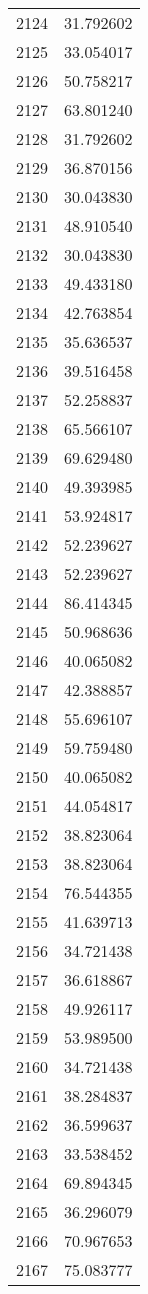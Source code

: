 \documentclass[12pt]{article}
\begin{document}
\begin{longtable}{@{}cc@{}}
2124 & 31.792602 \\
2125 & 33.054017 \\
2126 & 50.758217 \\
2127 & 63.801240 \\
2128 & 31.792602 \\
2129 & 36.870156 \\
2130 & 30.043830 \\
2131 & 48.910540 \\
2132 & 30.043830 \\
2133 & 49.433180 \\
2134 & 42.763854 \\
2135 & 35.636537 \\
2136 & 39.516458 \\
2137 & 52.258837 \\
2138 & 65.566107 \\
2139 & 69.629480 \\
2140 & 49.393985 \\
2141 & 53.924817 \\
2142 & 52.239627 \\
2143 & 52.239627 \\
2144 & 86.414345 \\
2145 & 50.968636 \\
2146 & 40.065082 \\
2147 & 42.388857 \\
2148 & 55.696107 \\
2149 & 59.759480 \\
2150 & 40.065082 \\
2151 & 44.054817 \\
2152 & 38.823064 \\
2153 & 38.823064 \\
2154 & 76.544355 \\
2155 & 41.639713 \\
2156 & 34.721438 \\
2157 & 36.618867 \\
2158 & 49.926117 \\
2159 & 53.989500 \\
2160 & 34.721438 \\
2161 & 38.284837 \\
2162 & 36.599637 \\
2163 & 33.538452 \\
2164 & 69.894345 \\
2165 & 36.296079 \\
2166 & 70.967653 \\
2167 & 75.083777 \\

\end{longtable}
\end{document}

